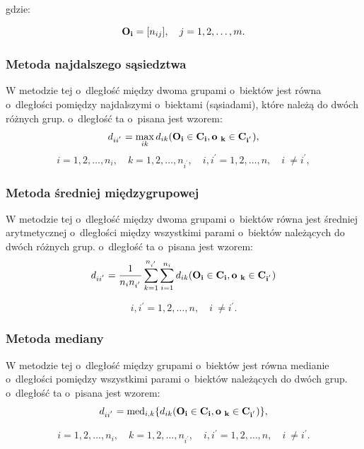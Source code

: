 \documentclass[12pt,a4paper]{report}
\newcommand{\mediana}{\operatorname{med}}
\begin{document}
gdzie:

$$
\bold{O_{i}}=[n_{ij}], \quad j=1,2,\dots,m.
$$

\subsubsection{Metoda najdalszego sąsiedztwa}


W metodzie tej o~dległość między dwoma grupami o~biektów jest równa o~dległości pomiędzy najdalszymi o~biektami (sąsiadami), które należą do dwóch różnych grup. o~dległość ta o~pisana jest wzorem: 
$$
d_{ii^{'}}= \max\limits_{ik} {d_{ik}(\bf{O_i} \in C_{i}, o~_{k} \in C_{i^{'}})},
$$
$$
i=1,2,\dots,n_{i}, \quad k=1,2,\dots,n_{i^{'}}, \quad i,i^{'}=1,2,\dots,n, \quad i~\neq i^{'}, 
$$


\subsubsection{Metoda średniej międzygrupowej}


W metodzie tej o~dległość między dwoma grupami o~biektów równa jest średniej arytmetycznej o~dległości między wszystkimi parami o~biektów należących do dwóch różnych grup. o~dległość ta o~pisana jest wzorem: 
$$
d_{ii^{'}}=\frac{1}{n_{i}n_{i^{'}}}\sum_{k=1}^{n_{i^{'}}}\sum_{i=1}^{n_{i}} d_{ik}(\bf{O_i} \in C_{i}, o~_{k} \in C_{i^{'}})
$$

$$i,i^{'}=1,2,\dots,n, \quad i~\neq i^{'}. $$


\subsubsection{Metoda mediany}


W metodzie tej o~dległość między grupami o~biektów jest równa medianie o~dległości pomiędzy wszystkimi parami o~biektów należących do dwóch grup. o~dległość ta o~pisana jest wzorem: 
$$
d_{ii^{'}}= \mediana_{i,k} \{d_{ik}(\bf{O_i} \in C_{i}, o~_{k} \in C_{i^{'}})\},
$$

$$i=1,2,\dots,n_{i}, \quad k=1,2,\dots,n_{i^{'}}, \quad i,i^{'}=1,2,\dots,n, \quad i~\neq i^{'}. $$
\end{document}
